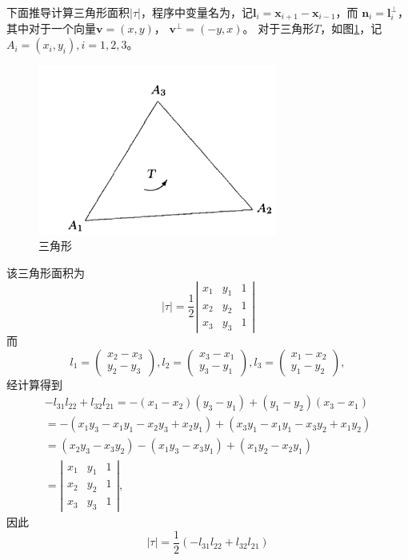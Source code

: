 \documentclass{ctexart}
\begin{document}
下面推导计算三角形面积$|\tau|$，程序中变量名为，记$\mathbf{l}_i=\mathbf{x}_{i+1}-\mathbf{x}_{i-1}$，而
$\mathbf{n}_i=\mathbf{l}_i^{\bot}$，其中对于一个向量$\mathbf{v}=(x,y)$，
$\mathbf{v}^{\bot}=(-y,x)$。
对于三角形$T$，如图\ref{Fig.三角形}，记$A_i=(x_i,y_i),i=1,2,3$。
\begin{figure}[H] %
    \centering %
    \includegraphics[width=0.7\textwidth]{img/三角元.png} %
    \caption{三角形} %
    \label{Fig.三角形} %
\end{figure}
该三角形面积为
$$
|\tau|=\frac{1}{2}\left | \begin{matrix}
    x_1& y_1 & 1\\
    x_2& y_2 & 1\\
    x_3& y_3 & 1
  \end{matrix} \right |  
$$
而
$$
l_1=\begin{pmatrix}
    x_2-x_3\\
   y_2-y_3
   \end{pmatrix},
   l_2=\begin{pmatrix}
    x_3-x_1\\
   y_3-y_1
   \end{pmatrix},
   l_3=\begin{pmatrix}
    x_1-x_2\\
   y_1-y_2
   \end{pmatrix},
$$
经计算得到
\begin{gather*}
    -l_{31}l_{22}+l_{32}l_{21}=-(x_1-x_2)(y_3-y_1)+(y_1-y_2)(x_3-x_1)\\
=-(x_1y_3-x_1y_1-x_2y_3+x_2y_1)+(x_3y_1-x_1y_1-x_3y_2+x_1y_2)\\
=(x_2y_3-x_3y_2)-(x_1y_3-x_3y_1)+(x_1y_2-x_2y_1)\\
=\left | \begin{matrix}
    x_1& y_1 & 1\\
    x_2& y_2 & 1\\
    x_3& y_3 & 1
  \end{matrix} \right |,
\end{gather*}
因此
$$
|\tau|=\frac{1}{2}(-l_{31}l_{22}+l_{32}l_{21})
$$
\end{document}
